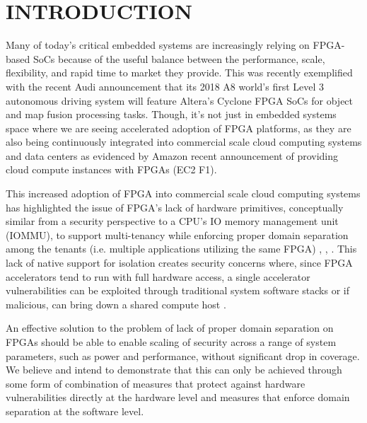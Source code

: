 \documentclass[sigconf]{acmart}
\theoremstyle{plain}
\theoremstyle{remark}
\begin{document}
\maketitle


\section{INTRODUCTION}\label{sec:intro}
Many of today's critical embedded systems are increasingly relying on FPGA-based SoCs because of the useful balance between the performance, scale, flexibility, and rapid time to market they provide. This was recently exemplified with the recent Audi announcement that its 2018 A8 world's first Level 3 autonomous driving system will feature Altera's Cyclone FPGA SoCs for object and map fusion processing tasks. Though, it's not just in embedded systems space where we are seeing accelerated adoption of FPGA platforms, as they are also being continuously integrated into commercial scale cloud computing systems and data centers as evidenced by Amazon recent announcement of providing cloud compute instances with FPGAs (EC2 F1).

This increased adoption of FPGA into commercial scale cloud computing systems has highlighted the issue of FPGA's lack of hardware primitives, conceptually similar from a security perspective to a CPU's IO memory management unit (IOMMU), to support multi-tenancy while enforcing proper domain separation among the tenants (i.e. multiple applications utilizing the same FPGA) \cite{CloudFPGA}, \cite{CapslHOST}, \cite{Byma2014FPGAsIT}. This lack of native support for isolation creates security concerns where, since FPGA accelerators tend to run with full hardware access, a single accelerator vulnerabilities can be exploited through traditional system software stacks or if malicious, can bring down a shared compute host \cite{CloudFPGA}.

An effective solution to the problem of lack of proper domain separation on FPGAs should be able to enable scaling of security across a range of system parameters, such as power and performance, without significant drop in coverage. We believe and intend to demonstrate that this can only be achieved through some form of combination of measures that protect against hardware vulnerabilities directly at the hardware level and measures that enforce domain separation at the software level.
\end{document}
